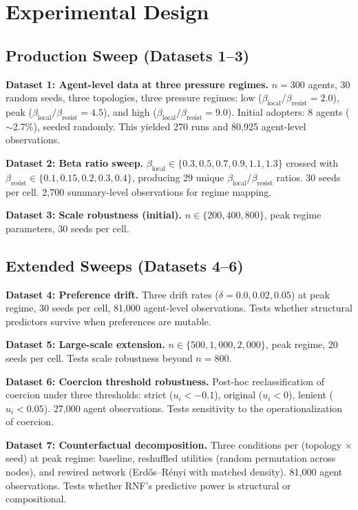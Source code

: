 \documentclass[11pt, a4paper]{article}
\newcommand{\betalocal}{\beta_{\text{local}}}
\newcommand{\betaresist}{\beta_{\text{resist}}}
\begin{document}
\section{Experimental Design}
\label{sec:experiments}

\subsection{Production Sweep (Datasets 1--3)}

\textbf{Dataset 1: Agent-level data at three pressure regimes.} $n = 300$ agents, 30 random seeds, three topologies, three pressure regimes: low ($\betalocal/\betaresist = 2.0$), peak ($\betalocal/\betaresist = 4.5$), and high ($\betalocal/\betaresist = 9.0$). Initial adopters: 8 agents ($\sim$2.7\%), seeded randomly. This yielded 270 runs and 80{,}925 agent-level observations.

\textbf{Dataset 2: Beta ratio sweep.} $\betalocal \in \{0.3, 0.5, 0.7, 0.9, 1.1, 1.3\}$ crossed with $\betaresist \in \{0.1, 0.15, 0.2, 0.3, 0.4\}$, producing 29 unique $\betalocal/\betaresist$ ratios. 30 seeds per cell. 2{,}700 summary-level observations for regime mapping.

\textbf{Dataset 3: Scale robustness (initial).} $n \in \{200, 400, 800\}$, peak regime parameters, 30 seeds per cell.

\subsection{Extended Sweeps (Datasets 4--6)}

\textbf{Dataset 4: Preference drift.} Three drift rates ($\delta = 0.0, 0.02, 0.05$) at peak regime, 30 seeds per cell, 81{,}000 agent-level observations. Tests whether structural predictors survive when preferences are mutable.

\textbf{Dataset 5: Large-scale extension.} $n \in \{500, 1{,}000, 2{,}000\}$, peak regime, 20 seeds per cell. Tests scale robustness beyond $n = 800$.

\textbf{Dataset 6: Coercion threshold robustness.} Post-hoc reclassification of coercion under three thresholds: strict ($u_i < -0.1$), original ($u_i < 0$), lenient ($u_i < 0.05$). 27{,}000 agent observations. Tests sensitivity to the operationalization of coercion.

\textbf{Dataset 7: Counterfactual decomposition.} Three conditions per (topology $\times$ seed) at peak regime: baseline, reshuffled utilities (random permutation across nodes), and rewired network (Erd\H{o}s--R\'{e}nyi with matched density). 81{,}000 agent observations. Tests whether RNF's predictive power is structural or compositional.
\end{document}
